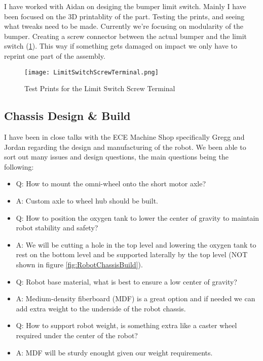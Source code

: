 \documentclass{report}
\begin{document}
    I have worked with Aidan on desiging the bumper limit switch. Mainly I have been focused on the 3D printablity of the part. Testing the prints, and seeing what tweaks need to be made. Currently we're focusing on modularity of the bumper. Creating a screw connector between the actual bumper and the limit switch (\ref{fig:LimitSwitchScrewTerminal}). This way if something gets damaged on impact we only have to reprint one part of the assembly.

    \begin{figure}[ht!]
        \centering
        \texttt{[image: LimitSwitchScrewTerminal.png]}
        \caption{Test Prints for the Limit Switch Screw Terminal}
        \label{fig:LimitSwitchScrewTerminal}
    \end{figure}

    \subsection{Chassis Design \& Build}
    I have been in close talks with the ECE Machine Shop specifically Gregg and Jordan regarding the design and manufacturing of the robot. We been able to sort out many issues and design questions, the main questions being the following:

    \begin{itemize}
        \item Q: How to mount the omni-wheel onto the short motor axle?
        \item A: Custom axle to wheel hub should be built.
        \item Q: How to position the oxygen tank to lower the center of gravity to maintain robot stability and safety?
        \item A: We will be cutting a hole in the top level and lowering the oxygen tank to rest on the bottom level and be supported laterally by the top level (NOT shown in figure \ref{fig:RobotChassisBuild}).
        \item Q: Robot base material, what is best to ensure a low center of gravity?
        \item A: Medium-density fiberboard (MDF) is a great option and if needed we can add extra weight to the underside of the robot chassis.
        \item Q: How to support robot weight, is something extra like a caster wheel required under the center of the robot?
        \item A: MDF will be sturdy enought given our weight requirements.
    \end{itemize}
\end{document}
